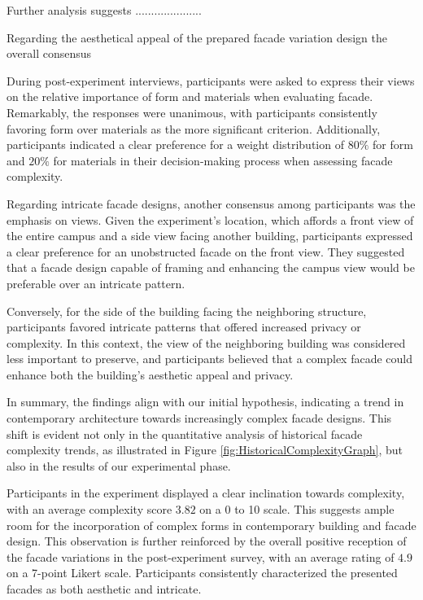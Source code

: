 Further analysis suggests .....................

Regarding the aesthetical appeal of the prepared facade variation design the overall consensus


During post-experiment interviews, participants were asked to express their views on the relative importance of form and materials when evaluating facade.
Remarkably, the responses were unanimous, with participants consistently favoring form over materials as the more significant criterion.
Additionally, participants indicated a clear preference for a weight distribution of \(80\%\) for form and \(20\%\) for materials in their decision-making process when assessing facade complexity.

Regarding intricate facade designs, another consensus among participants was the emphasis on views.
Given the experiment's location, which affords a front view of the entire campus and a side view facing another building, participants expressed a clear preference for an unobstructed facade on the front view.
They suggested that a facade design capable of framing and enhancing the campus view would be preferable over an intricate pattern.

Conversely, for the side of the building facing the neighboring structure, participants favored intricate patterns that offered increased privacy or complexity.
In this context, the view of the neighboring building was considered less important to preserve, and participants believed that a complex facade could enhance both the building's aesthetic appeal and privacy.


In summary, the findings align with our initial hypothesis, indicating a trend in contemporary architecture towards increasingly complex facade designs.
This shift is evident not only in the quantitative analysis of historical facade complexity trends, as illustrated in Figure \ref{fig:HistoricalComplexityGraph}, but also in the results of our experimental phase.

Participants in the experiment displayed a clear inclination towards complexity, with an average complexity score \(3.82\) on a 0 to 10 scale.
This suggests ample room for the incorporation of complex forms in contemporary building and facade design.
This observation is further reinforced by the overall positive reception of the facade variations in the post-experiment survey, with an average rating of \(4.9\) on a 7-point Likert scale.
Participants consistently characterized the presented facades as both aesthetic and intricate.

